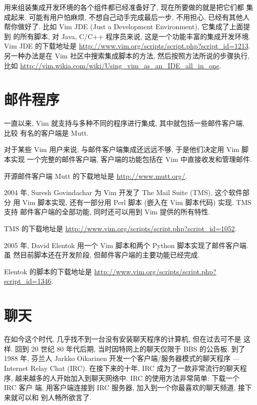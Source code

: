 用来组装集成开发环境的各个组件都已经准备好了, 现在所要做的就是把它们都
集成起来. 可能有用户怕麻烦, 不想自己动手完成最后一步, 不用担心, 已经有其他人
帮你做好了. 比如 Vim JDE (Just a Development Environment), 它集成了上面提到
的所有脚本, 对 Java, C/C++ 程序员来说, 这是一个功能丰富的集成开发环境. Vim JDE
的下载地址是 \url{http://www.vim.org/scripts/script.php?script_id=1213}.
另一种办法是在 Vim 社区中搜索集成脚本的方法, 然后按照方法所说的步骤执行,
比如 \url{http://vim.wikia.com/wiki/Using_vim_as_an_IDE_all_in_one}.

\section{邮件程序}
\label{sec:mail_program}

一直以来, Vim 就支持与多种不同的程序进行集成, 其中就包括一些邮件客户端, 比较
有名的客户端是 Mutt.

对于某些 Vim 用户来说, 与邮件客户端集成还远远不够, 于是他们决定用 Vim 脚本实现
一个完整的邮件客户端, 客户端的功能包括在 Vim 中直接收发和管理邮件.

\begin{warning}
    开源邮件客户端 Mutt 的下载地址是 \url{http://www.mutt.org/}.
\end{warning}

2004 年, Suresh Govindachar 为 Vim 开发了 The Mail Suite (TMS), 这个软件部分
用 Vim 脚本实现, 还有一部分用 Perl 脚本 (嵌入在 Vim 脚本代码) 实现. TMS 支持
邮件客户端的全部功能, 同时还可以用到 Vim 提供的所有特性.

TMS 的下载地址是 \url{http://www.vim.org/scripts/script.php?script_id=1052}.

2005 年, David Elentok 用一个 Vim 脚本和两个 Python 脚本实现了邮件客户端. 虽
然目前脚本还在开发阶段, 但邮件客户端的主要功能已经完成.

Elentok 的脚本的下载地址是
\url{http://www.vim.org/scripts/script.php?script_id=1346}.

\section{聊天}
\label{sec:chat_with_vim}

在如今这个时代, 几乎找不到一台没有安装聊天程序的计算机, 但在过去可不是
这样. 回到 20 世纪 80 年代后期, 当时因特网上的聊天仅限于 BBS 的公告板. 到了
1988 年, 芬兰人 Jarkko Oikarinen 开发一个客户端/服务器模式的聊天程序 ---
Internet Relay Chat (IRC). 在接下来的十年, IRC 成为了一款非常流行的聊天程序,
越来越多的人开始加入到聊天网络中. IRC 的使用方法非常简单: 下载一个 IRC 客户
端, 用客户端连接到 IRC 服务器, 加入到一个你最喜欢的聊天频道, 接下来就可以和
别人畅所欲言了.


